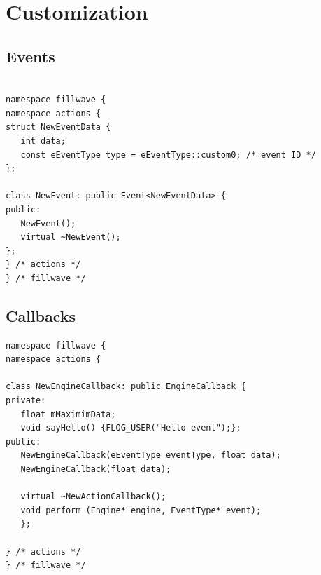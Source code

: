 \documentclass{article}
\begin{document}
\newpage

\section{Customization}

\subsection{Events}\label{sec:Custom events}
\begin{lstlisting}

namespace fillwave {
namespace actions {
struct NewEventData {
   int data;
   const eEventType type = eEventType::custom0; /* event ID */
};

class NewEvent: public Event<NewEventData> {
public:
   NewEvent();
   virtual ~NewEvent();
};
} /* actions */
} /* fillwave */
\end{lstlisting}
\subsection{Callbacks}\label{sec:Custom callbacks}
\begin{lstlisting}
namespace fillwave {
namespace actions {

class NewEngineCallback: public EngineCallback {
private:
   float mMaximimData;
   void sayHello() {FLOG_USER("Hello event");};
public:
   NewEngineCallback(eEventType eventType, float data);
   NewEngineCallback(float data);

   virtual ~NewActionCallback();
   void perform (Engine* engine, EventType* event);
   };

} /* actions */
} /* fillwave */
\end{lstlisting}
\end{document}
